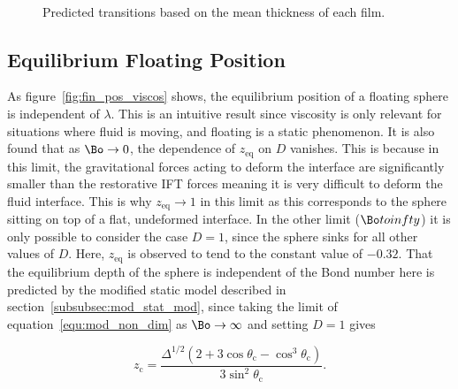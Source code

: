 {\begin{figure}
      \begin{subfigure}[b]{0.45\textwidth}
        \resizebox{\textwidth}{!}{\Large }
        \caption{}
        \label{fig:float3}
      \end{subfigure}
      ~
      \begin{subfigure}[b]{0.45\textwidth}
        \resizebox{\textwidth}{!}{\Large }
        \caption{}
        \label{fig:float4}
      \end{subfigure}
      \caption{Predicted transitions based on the mean thickness of each film. }\label{fig:float_trans}
    \end{figure}

\subsection{Equilibrium Floating Position}
\label{subsec:dis_float_pos}

As figure~\ref{fig:fin_pos_viscos} shows, the equilibrium position of a floating sphere is independent of $\lambda$. This is an intuitive result since viscosity is only relevant for situations where fluid is moving, and floating is a static phenomenon. It is also found that as $\Bo \to 0$, the dependence of $z_{\text{eq}}$ on $D$ vanishes. This is because in this limit, the gravitational forces acting to deform the interface are significantly smaller than the restorative IFT forces meaning it is very difficult to deform the fluid interface. This is why $z_{\text{eq}} \to 1$ in this limit as this corresponds to the sphere sitting on top of a flat, undeformed interface. In the other limit ($\Bo to infty$) it is only possible to consider the case $D = 1$, since the sphere sinks for all other values of $D$. Here, $z_{\text{eq}}$ is observed to tend to the constant value of $-0.32$. That the equilibrium depth of the sphere is independent of the Bond number here is predicted by the modified static model described in section~\ref{subsubsec:mod_stat_mod}, since taking the limit of equation~\ref{equ:mod_non_dim} as $\Bo \to \infty$ and setting $D = 1$ gives

\begin{equation}
\label{equ:bo_to_infty}
z_{\text{c}} = \frac{\Delta^{1/2} (2 + 3 \cos \theta_{\text{c}} - \cos^{3} \theta_{\text{c}})}{3 \sin^{2} \theta_{\text{c}}}.
\end{equation}

}
